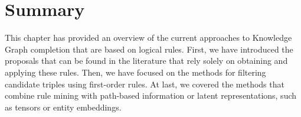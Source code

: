 \section{Summary}\label{sec:rule-summary}
This chapter has provided an overview of the current approaches to Knowledge Graph completion that are based on logical rules. First, we have introduced the proposals that can be found in the literature that rely solely on obtaining and applying these rules. Then, we have focused on the methods for filtering candidate triples using first-order rules. At last, we covered the methods that combine rule mining with path-based information or latent representations, such as tensors or entity embeddings.